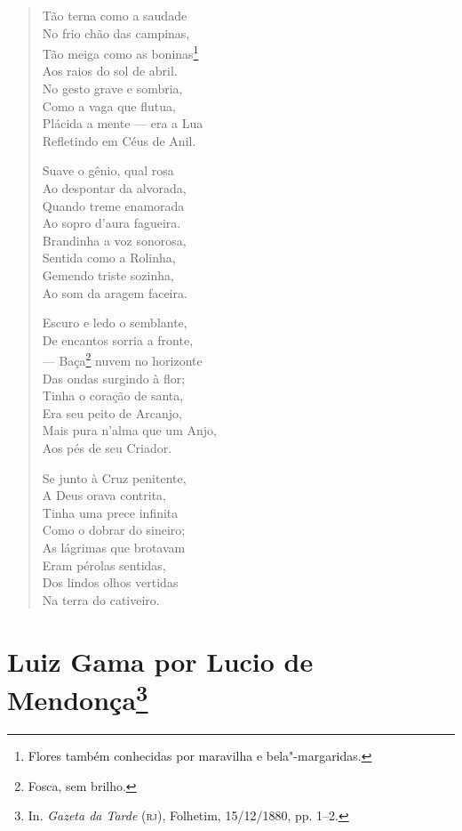 \begin{verse}
Tão terna como a saudade\\
No frio chão das campinas,\\
Tão meiga como as boninas\footnote{Flores também conhecidas por maravilha e bela"-margaridas.}\\
Aos raios do sol de abril.\\
No gesto grave e sombria,\\
Como a vaga que flutua,\\
Plácida a mente --- era a Lua\\
Refletindo em Céus de Anil.

Suave o gênio, qual rosa\\
Ao despontar da alvorada,\\
Quando treme enamorada\\
Ao sopro d'aura fagueira.\\
Brandinha a voz sonorosa,\\
Sentida como a Rolinha,\\
Gemendo triste sozinha,\\
Ao som da aragem faceira.

Escuro e ledo o semblante,\\
De encantos sorria a fronte,\\
--- Baça\footnote{Fosca, sem brilho.} nuvem no horizonte\\
Das ondas surgindo à flor;\\
Tinha o coração de santa,\\
Era seu peito de Arcanjo,\\
Mais pura n'alma que um Anjo,\\
Aos pés de seu Criador.

Se junto à Cruz penitente,\\
A Deus orava contrita,\\
Tinha uma prece infinita\\
Como o dobrar do sineiro;\\
As lágrimas que brotavam\\
Eram pérolas sentidas,\\
Dos lindos olhos vertidas\\
Na terra do cativeiro.
\end{verse}



\chapter{Luiz Gama por Lucio de Mendonça\footnote[*]{In.
  \emph{Gazeta da Tarde} (\textsc{rj}), Folhetim, 15/12/1880, pp. 1--2.}}

